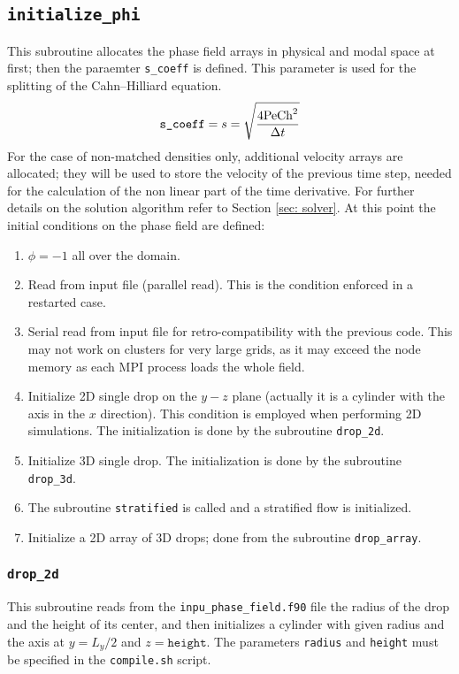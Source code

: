 \subsection{\texttt{initialize\_phi}}
This subroutine allocates the phase field arrays in physical and modal space at first; then the paraemter \texttt{s\_coeff} is defined. This parameter is used for the splitting of the Cahn--Hilliard equation.
\[
\texttt{s\_coeff}=s=\sqrt{\frac{4\textnormal{Pe}\textnormal{Ch}^2}{\Delta t}}
\]
For the case of non-matched densities only, additional velocity arrays are allocated; they will be used to store the velocity of the previous time step, needed for the calculation of the non linear part of the time derivative. For further details on the solution algorithm refer to Section \ref{sec: solver}.
At this point the initial conditions on the phase field are defined:
\begin{enumerate}
\item $\phi=-1$ all over the domain.
\item Read from input file (parallel read). This is the condition enforced in a restarted case.
\item Serial read from input file for retro-compatibility with the previous code. This may not work on clusters for very large grids, as it may exceed the node memory as each MPI process loads the whole field.
\item Initialize 2D single drop  on the $y-z$ plane (actually it is a cylinder with the axis in the $x$ direction). This condition is employed when performing 2D simulations. The initialization is done by the subroutine \texttt{drop\_2d}.
\item Initialize 3D single drop. The initialization is done by the subroutine \texttt{drop\_3d}.
\item The subroutine \texttt{stratified} is called and a stratified flow is initialized.
\item Initialize a 2D array of 3D drops; done from the subroutine \texttt{drop\_array}.
\end{enumerate}

\subsubsection{\texttt{drop\_2d}}
This subroutine reads from the \texttt{inpu\_phase\_field.f90} file the radius of the drop and the height of its center, and then initializes a cylinder with given radius and the axis at $y=L_y/2$ and $z=\texttt{height}$. The parameters \texttt{radius} and \texttt{height} must be specified in the \texttt{compile.sh} script.

